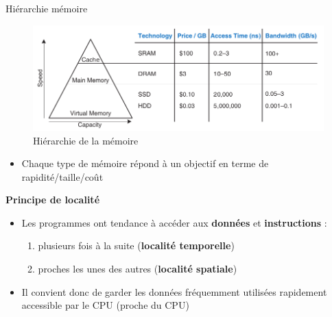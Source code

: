 \documentclass[8pt]{beamer}
\begin{document}
\begin{frame}{Hiérarchie mémoire}

    \begin{figure}
        \centering
        \includegraphics[width=.75\textwidth]{figures/memory_speed_HH.png}
        \caption{Hiérarchie de la mémoire \cite{harris2021digital}}
    \end{figure}
    \begin{itemize}
        \item Chaque type de m\'emoire r\'epond \`a un objectif en
              terme de
              rapidit\'e/taille/co\^ut
    \end{itemize}
    \textbf{Principe de localité}
    \begin{itemize}
        \item Les programmes ont tendance à accéder aux \textbf{données} et
              \textbf{instructions} :
              \begin{enumerate}
                  \item plusieurs fois \`a la suite (\textbf{localité
                            temporelle})
                  \item proches les unes des autres (\textbf{localité
                            spatiale})
              \end{enumerate}
        \item Il convient donc de garder les données fréquemment utilisées
              rapidement
              accessible par le CPU (proche du CPU)
    \end{itemize}

\end{frame}
\end{document}

